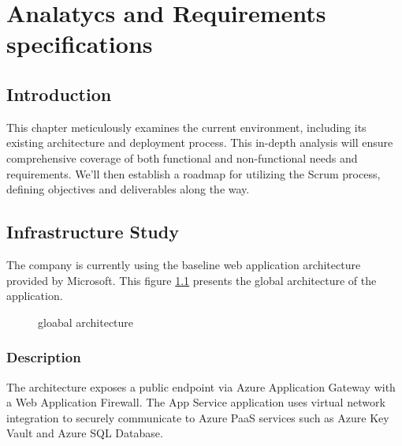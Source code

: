 \chapter{Analatycs and Requirements specifications}

\section*{Introduction}
This chapter meticulously examines the current environment, including its existing architecture and deployment process. This in-depth analysis will ensure comprehensive coverage of both functional and non-functional needs and requirements. We'll then establish a roadmap for utilizing the Scrum process, defining objectives and deliverables along the way.

\section{Infrastructure Study}
The company is currently using the baseline web application architecture provided by Microsoft\cite{baseline}.
This figure \ref{fig:gloabal_architecture} presents the global architecture of the application.

\begin{figure}[H]
    \centering
    \caption{gloabal architecture}
    \label{fig:gloabal_architecture}
\end{figure}

\pagebreak

\subsection{Description} The architecture exposes a public endpoint via Azure Application Gateway with a Web Application Firewall. The App Service application uses virtual network integration to securely communicate to Azure PaaS services such as Azure Key Vault and Azure SQL Database.

